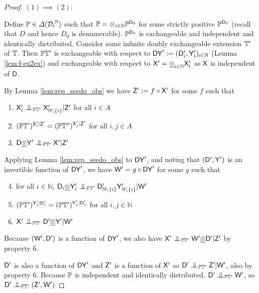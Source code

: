 \begin{proof}
$(1)\implies (2)$:

Define $\mathbb{P}\in \Delta(\mathcal{D_0}^{\mathbb{N}})$ such that $\mathbb{P}=\otimes_{i\in\mathbb{N}} \mathbb{P}^{\mathsf{D}_0}$ for some strictly positive $\mathbb{P}^{\mathsf{D}_0}$ (recall that $D$ and hence $D_0$ is denumerable). $\mathbb{P}^{\mathsf{D}_0}$ is exchangeable and independent and identically distributed. Consider some infinite doubly exchangeable extension $\mathbb{T}'$ of $\mathbb{T}$. Then $\mathbb{P}\mathbb{T}'$ is exchangeable with respect to $\mathsf{DY}':=(\mathsf{D}'_i,\mathsf{Y}'_i)_{i\in\mathbb{N}}$ (Lemma \ref{lem:f-ex2ex}) and exchangeable with respect to $\mathsf{X}'=\underline{\otimes}_{i\in\mathbb{N}} \mathsf{X}'_i$ as $\mathsf{X}$ is independent of $\mathsf{D}$.


By Lemma \ref{lem:rep_seedo_obs} we have $\mathsf{Z}':= f\circ\mathsf{X}'$ for some $f$ such that 
\begin{enumerate}
    \item $\RV{X}'_i\CI_{\prob{P}\kernel{T}'}\RV{X}'_{\mathbb{N}\setminus\{i\}}|\RV{Z}'$ for all $i\in A$
    \item $(\mathbb{P}\mathbb{T}')^{\mathsf{X}'_i|\mathsf{Z}'}=(\mathbb{P}\mathbb{T}'')^{\mathsf{X}'_j|\mathsf{Z}'}$ for all $i,j\in A$
    \item $\RV{D}\utimes\RV{Y}'\CI_{\prob{P}\kernel{T}'}\RV{X}'|\RV{Z}'$
\end{enumerate}

Applying Lemma  \ref{lem:rep_seedo_obs} to $\mathsf{DY}'$, and noting that $(\mathsf{D}',\mathsf{Y}')$ is an invertible function of $\mathsf{DY}'$, we have $\mathsf{W}'=g\circ\mathsf{DY}'$ for some $g$ such that

\begin{enumerate}
    \setcounter{enumi}{3}
    \item for all $i\in \mathbb{N}$, $\RV{D}_i\utimes\RV{Y}'_i\CI_{\prob{P}\kernel{T}'}\RV{D}'_{\mathbb{N}\setminus\{i\}}\RV{Y}'_{\mathbb{N}\setminus\{i\}}|\RV{W}'$
    \item $(\mathbb{P}\mathbb{T}')^{\mathsf{Y}'_i|\mathsf{D}'_i}=(\mathbb{P}\mathbb{T}')^{\mathsf{Y}'_j|\mathsf{D}'_j}$ for all $i,j\in \mathbb{N}$ 
    \item $\RV{X}'\CI_{\prob{P}\kernel{T}'}\RV{D}'\utimes\RV{Y}'|\RV{W}'$
\end{enumerate}

Because $(\mathsf{W}',\mathsf{D}')$ is a function of $\mathsf{DY}'$, we also have $\RV{X}'\CI_{\prob{P}\kernel{T}'} \RV{W}'\utimes\RV{D}'|\RV{Z}'$ by property 6.

$\mathsf{D}'$ is also a function of $\mathsf{DY}'$ and $\mathsf{Z}'$ is a function of $\mathsf{X}'$ so $\RV{D}'\CI_{\prob{P}\kernel{T}'}\RV{Z}'|\RV{W}'$, also by property 6. Because $\mathbb{P}$ is independent and identically distributed, $\RV{D}'\CI_{\prob{P}\kernel{T}'} \RV{W}'$, so $\RV{D}'\CI_{\prob{P}\kernel{T}'}(\RV{Z}', \RV{W}')$


\end{proof}
